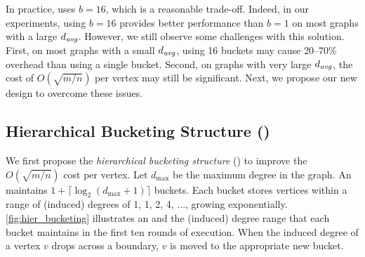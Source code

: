 
In practice, \Julienne{} uses $b=16$, which is a reasonable trade-off.
Indeed, in our experiments, using $b=16$ provides better performance than $b=1$ on most graphs with a large $d_{\text{\it avg}}$. 
However, we still observe some challenges with this solution. 
First, on most graphs with a small $d_{\text{\it avg}}$, using 16 buckets may cause 20--70\% overhead than using a single bucket.
Second, on graphs with very large $d_{\text{\it avg}}$, the cost of $O(\sqrt{m/n})$ per vertex may still be significant. 
Next, we propose our new design to overcome these issues. 

% 



\subsection{Hierarchical Bucketing Structure (\HBS)}
We first propose the \emph{hierarchical bucketing structure} (\HBS) to improve the $O(\sqrt{m/n})$ cost per vertex. 
Let $d_{\max}$ be the maximum degree in the graph. 
An \HBS maintains $1+\lceil\log_2 (d_{\max}+1)\rceil$ buckets. 
Each bucket stores vertices within a range of (induced) degrees of 1, 1, 2, 4, ..., growing exponentially. 
\cref{fig:hier_bucketing} illustrates an \HBS and the (induced) degree range that each bucket maintains in the first ten rounds of execution.
When the induced degree of a vertex $v$ drops across a boundary, $v$ is moved to the appropriate new bucket. 

